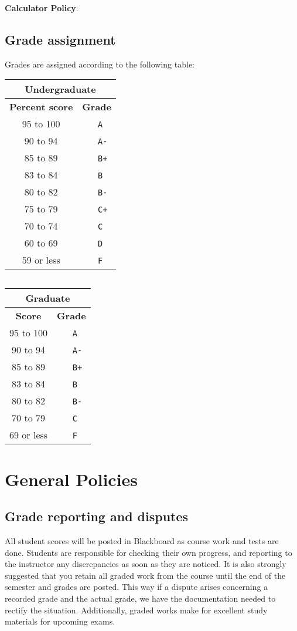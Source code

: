 \documentclass[12pt]{article}
\begin{document}
\medskip
\textbf{Calculator Policy}: 


\subsection{Grade assignment} Grades are assigned according to the following table:

\begin{center}
  \begin{tabular}[t]{c|cl}
    \multicolumn{3}{c}{\textbf{Undergraduate}}\\
    \hline
    \textbf{Percent score} & \multicolumn{2}{c}{\textbf{Grade}}\\
    \hline
    95 to 100	&& \ \texttt{A}\\
    90 to 94 	&& \ \texttt{A-}\\
    85 to 89 	&& \ \texttt{B+}\\
    83 to 84	&& \ \texttt{B}  \\
    80 to 82	&& \ \texttt{B-} \\
    75 to 79	&& \ \texttt{C+} \\
    70 to 74	&& \ \texttt{C}  \\
    60 to 69	&& \ \texttt{D}  \\
    59 or less  && \ \texttt{F}
  \end{tabular}
$\quad$
  \begin{tabular}[t]{c|cl}
    \multicolumn{3}{c}{\textbf{Graduate}}\\
    \hline
    \textbf{Score} & \multicolumn{2}{c}{\textbf{Grade}}\\
    \hline
    95 to 100	&& \ \texttt{A}  \\
    90 to 94 	&& \ \texttt{A-} \\
    85 to 89 	&& \ \texttt{B+} \\
    83 to 84	&& \ \texttt{B}  \\
    80 to 82	&& \ \texttt{B-} \\
    70 to 79	&& \ \texttt{C}  \\
    69 or less  && \ \texttt{F}
  \end{tabular}
\end{center}

\section{General Policies}

\subsection {Grade reporting and disputes} All student scores will be posted in Blackboard
as course work and tests are done. Students are responsible for checking their own progress, and
reporting to the instructor any discrepancies as soon as they are noticed. It is also strongly suggested
that you retain all graded work from the course until the end of the semester and grades are posted.
This way if a dispute arises concerning a recorded grade and the actual grade, we have the documentation
needed to rectify the situation. Additionally, graded works make for excellent study materials for upcoming
exams.  
\end{document}
